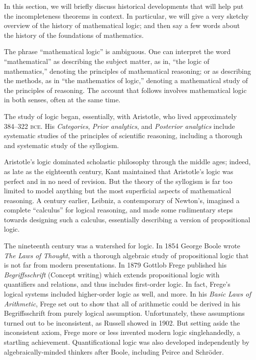 \documentclass[../../../include/open-logic-section]{subfiles}
\begin{document}


In this section, we will briefly discuss historical developments that
will help put the incompleteness theorems in context. In particular,
we will give a very sketchy overview of the history of mathematical
logic; and then say a few words about the history of the foundations
of mathematics.

\begin{digress}
  The phrase ``mathematical logic'' is ambiguous. One can interpret the
word ``mathematical'' as describing the subject matter, as in, ``the
logic of mathematics,'' denoting the principles of mathematical
reasoning; or as describing the methods, as in ``the mathematics of
logic,'' denoting a mathematical study of the principles of reasoning.
The account that follows involves mathematical logic in both senses,
often at the same time.
\end{digress}

The study of logic began, essentially, with Aristotle, who lived
approximately 384--322 \textsc{bce}. His \emph{Categories}, \emph{Prior
  analytics}, and \emph{Posterior analytics} include systematic
studies of the principles of scientific reasoning, including a
thorough and systematic study of the syllogism.

Aristotle's logic dominated scholastic philosophy through the middle
ages; indeed, as late as the eighteenth century, Kant maintained that
Aristotle's logic was perfect and in no need of revision. But the
theory of the syllogism is far too limited to model anything but
the most superficial aspects of mathematical reasoning. A century
earlier, Leibniz, a contemporary of Newton's, imagined a complete
``calculus'' for logical reasoning, and made some rudimentary steps
towards designing such a calculus, essentially describing a version of
propositional logic.

The nineteenth century was a watershed for logic. In 1854 George Boole
wrote \emph{The Laws of Thought}, with a thorough algebraic study of
propositional logic that is not far from modern presentations. In 1879
Gottlob Frege published his \emph{Begriffsschrift} (Concept writing)
which extends propositional logic with quantifiers and relations, and
thus includes first-order logic. In fact, Frege's logical systems
included higher-order logic as well, and more. In his \emph{Basic Laws
  of Arithmetic}, Frege set out to show that all of arithmetic could
be derived in his Begriffsschrift from purely logical
assumption. Unfortunately, these assumptions turned out to be
inconsistent, as Russell showed in 1902. But setting aside the
inconsistent axiom, Frege more or less invented modern logic
singlehandedly, a startling achievement. Quantificational logic was
also developed independently by algebraically-minded thinkers after
Boole, including Peirce and Schr\"oder.
\end{document}
